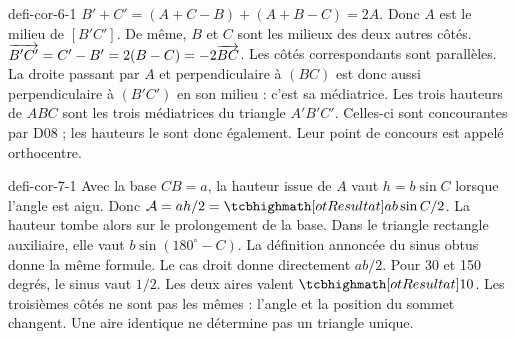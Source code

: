 \begin{blocEdition}{defi-cor-6-1}
$B'+C'=(A+C-B)+(A+B-C)=2A$. Donc $A$ est le milieu de $[B'C']$. De même, $B$ et $C$ sont les milieux des deux autres côtés.
$\overrightarrow{B'C'}=C'-B'=2(B-C)=-2\overrightarrow{BC}$. Les côtés correspondants sont parallèles. La droite passant par $A$ et perpendiculaire à $(BC)$ est donc aussi perpendiculaire à $(B'C')$ en son milieu : c’est sa médiatrice.
Les trois hauteurs de $ABC$ sont les trois médiatrices du triangle $A'B'C'$. Celles-ci sont concourantes par D08 ; les hauteurs le sont donc également. Leur point de concours est appelé orthocentre.
\label{fig-defi-cor-6}

\end{blocEdition}
\begin{blocEdition}{defi-cor-7-1}
Avec la base $CB=a$, la hauteur issue de $A$ vaut $h=b\sin C$ lorsque l’angle est aigu. Donc $\mathcal A=ah/2=\res{ab\sin C/2}$.
La hauteur tombe alors sur le prolongement de la base. Dans le triangle rectangle auxiliaire, elle vaut $b\sin(180^\circ-C)$. La définition annoncée du sinus obtus donne la même formule. Le cas droit donne directement $ab/2$.
Pour 30 et 150 degrés, le sinus vaut $1/2$. Les deux aires valent $\res{10}$. Les troisièmes côtés ne sont pas les mêmes : l’angle et la position du sommet changent. Une aire identique ne détermine pas un triangle unique.
\label{fig-defi-cor-7}

\end{blocEdition}
